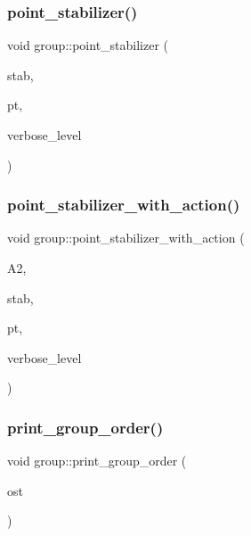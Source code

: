 \subsubsection{\texorpdfstring{point\+\_\+stabilizer()}{point\_stabilizer()}}
{\footnotesize\ttfamily void group\+::point\+\_\+stabilizer (\begin{DoxyParamCaption}\item[{\mbox{\hyperlink{classgroup}{group}} \&}]{stab,  }\item[{\mbox{\hyperlink{galois_8h_a09fddde158a3a20bd2dcadb609de11dc}{I\+NT}}}]{pt,  }\item[{\mbox{\hyperlink{galois_8h_a09fddde158a3a20bd2dcadb609de11dc}{I\+NT}}}]{verbose\+\_\+level }\end{DoxyParamCaption})}

\mbox{\label{classgroup_a4bf09ea3350d11ee1e0757d0a02ac3cc}} 
\subsubsection{\texorpdfstring{point\+\_\+stabilizer\+\_\+with\+\_\+action()}{point\_stabilizer\_with\_action()}}
{\footnotesize\ttfamily void group\+::point\+\_\+stabilizer\+\_\+with\+\_\+action (\begin{DoxyParamCaption}\item[{\mbox{\hyperlink{classaction}{action}} $\ast$}]{A2,  }\item[{\mbox{\hyperlink{classgroup}{group}} \&}]{stab,  }\item[{\mbox{\hyperlink{galois_8h_a09fddde158a3a20bd2dcadb609de11dc}{I\+NT}}}]{pt,  }\item[{\mbox{\hyperlink{galois_8h_a09fddde158a3a20bd2dcadb609de11dc}{I\+NT}}}]{verbose\+\_\+level }\end{DoxyParamCaption})}

\mbox{\label{classgroup_aa43ecff562ccdcb7305ace4e7414f3d8}} 
\subsubsection{\texorpdfstring{print\+\_\+group\+\_\+order()}{print\_group\_order()}}
{\footnotesize\ttfamily void group\+::print\+\_\+group\+\_\+order (\begin{DoxyParamCaption}\item[{ostream \&}]{ost }\end{DoxyParamCaption})}

